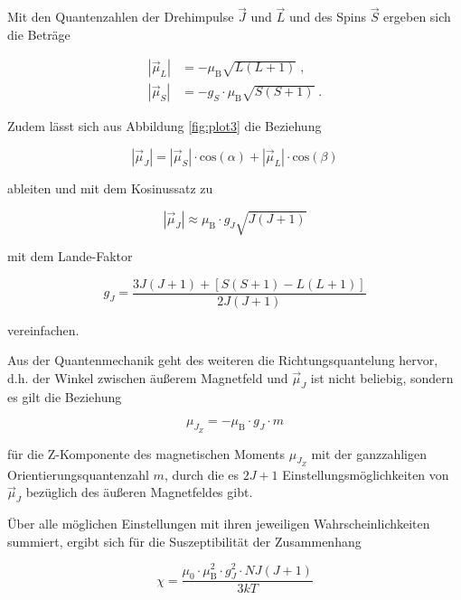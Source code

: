Mit den Quantenzahlen der Drehimpulse $\vec{J}$ und $\vec{L}$ und des Spins $\vec{S}$
ergeben sich die Beträge

\begin{align}
    |\vec{\mu}_L| &= - \mu_\text{B} \sqrt{L\left(L+1\right)} \; \text{,}\\
    |\vec{\mu}_S| &= - g_S \cdot \mu_\text{B} \sqrt{S\left(S+1\right)} \; .
\end{align}

Zudem lässt sich aus Abbildung \ref{fig:plot3} die Beziehung

\begin{equation}
    |\vec{\mu}_J| = |\vec{\mu}_S| \cdot \text{cos}\left(\alpha \right) + 
    |\vec{\mu}_L| \cdot \text{cos}\left(\beta \right)
\end{equation}

ableiten und mit dem Kosinussatz zu 

\begin{equation}
    |\vec{\mu}_J| \approx \mu_\text{B} \cdot g_J \sqrt{J\left(J+1\right)}
\end{equation}

mit dem Lande-Faktor 

\begin{equation}
    g_J = \frac{3J(J+1) + [S(S+1) - L(L+1)]} {2 J(J+1)}
\end{equation}

vereinfachen.

Aus der Quantenmechanik geht des weiteren die Richtungsquantelung hervor, d.h.
der Winkel zwischen äußerem Magnetfeld und $\vec{\mu}_J$ ist nicht beliebig,
sondern es gilt die Beziehung 

\begin{equation}
    \mu_{J_Z} = - \mu_\text{B} \cdot g_J \cdot m
\end{equation}

für die Z-Komponente des magnetischen Moments $\mu_{J_Z}$ mit der ganzzahligen 
Orientierungsquantenzahl $m$, durch die es $2J+1$ Einstellungsmöglichkeiten
von $\vec{\mu}_J$ bezüglich des äußeren Magnetfeldes gibt. 

Über alle möglichen Einstellungen mit ihren jeweiligen Wahrscheinlichkeiten summiert,
ergibt sich für die Suszeptibilität der Zusammenhang

\begin{equation}
    \chi = \frac{\mu_0 \cdot \mu_\text{B}^2 \cdot g_J^2 \cdot N J (J+1)}{3kT}
    \label{eqn:theo}
\end{equation}

